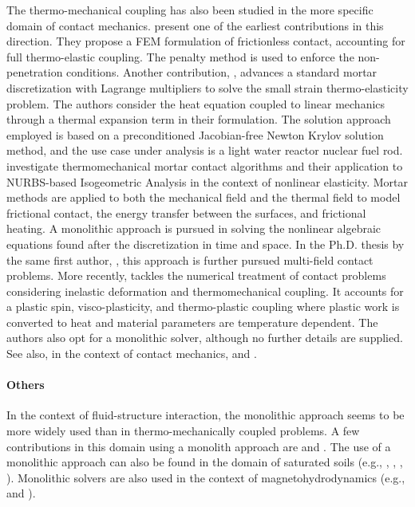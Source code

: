 The thermo-mechanical coupling has also been studied in the more specific domain of contact mechanics.
\cite{zavarise_real_1992} present one of the earliest contributions in this direction.
They propose a FEM formulation of frictionless contact, accounting for full thermo-elastic coupling.
The penalty method is used to enforce the non-penetration conditions.
Another contribution, \cite{hansen_jacobian-free_2011}, advances a standard mortar discretization with Lagrange multipliers to solve the small strain thermo-elasticity problem.
The authors consider the heat equation coupled to linear mechanics through a thermal expansion term in their formulation.
The solution approach employed is based on a preconditioned Jacobian-free Newton Krylov solution method, and the use case under analysis is a light water reactor nuclear fuel rod.
\cite{dittmann_isogeometric_2014} investigate thermomechanical mortar contact algorithms and their application to NURBS-based Isogeometric Analysis in the context of nonlinear elasticity.
Mortar methods are applied to both the mechanical field and the thermal field to model frictional contact, the energy transfer between the surfaces, and frictional heating.
A monolithic approach is pursued in solving the nonlinear algebraic equations found after the discretization in time and space.
In the Ph.D. thesis by the same first author, \cite{dittmann_isogeometric_2017}, this approach is further pursued multi-field contact problems.
More recently, \cite{seitz_computational_2018, seitz_computational_2019} tackles the numerical treatment of contact problems considering inelastic deformation and thermomechanical coupling.
It accounts for a plastic spin, visco-plasticity, and thermo-plastic coupling where plastic work is converted to heat and material parameters are temperature dependent.
The authors also opt for a monolithic solver, although no further details are supplied.
See also, in the context of contact mechanics, \cite{oancea_finite_1997, pantuso_finite_2000, hueber_thermo-mechanical_2009, hesch_energy-momentum_2011, gitterle_dual_2012} and \cite{novascone_evaluation_2015}.

\paragraph{Others}

In the context of fluid-structure interaction, the monolithic approach seems to be more widely used than in thermo-mechanically coupled problems.
A few contributions in this domain using a monolith approach are \cite{blom_efficient_2017, heil_efficient_2004, hubner_monolithic_2004, michler_monolithic_2004, zhangStudiesStrongCoupling2004, dettmer_computational_2006, hron_monolithic_2006, tezduyar2006space, kuttler_coupling_2010,gee_truly_2011, kloppel_fluidstructure_2011, mayr_temporal_2015} and \cite{mayr_hybrid_2020}.
The use of a monolithic approach can also be found in the domain of saturated soils (e.g., \cite{lewis_finite_1993}, \cite{borja_elastoplastic_1998}, \cite{jha_locally_2007}, \cite{white_stabilized_2008}).
Monolithic solvers are also used in the context of magnetohydrodynamics (e.g., \cite{SHADID20107649} and \cite{badia_block_2014}).


